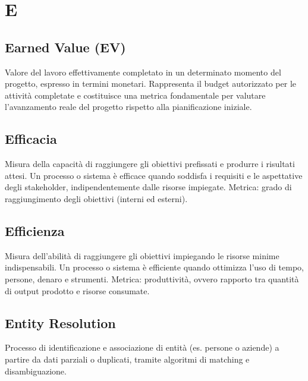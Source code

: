 \documentclass[a4paper,11pt]{article}
\begin{document}
\newpage





\section{E}

\subsection{Earned Value (EV)}
Valore del lavoro effettivamente completato in un determinato momento del progetto, espresso in termini monetari. Rappresenta il budget autorizzato per le attività completate e costituisce una metrica fondamentale per valutare l'avanzamento reale del progetto rispetto alla pianificazione iniziale.






\subsection{Efficacia}
Misura della capacità di raggiungere gli obiettivi prefissati e produrre i risultati attesi. Un processo o sistema è efficace quando soddisfa i requisiti e le aspettative degli stakeholder, indipendentemente dalle risorse impiegate. Metrica: grado di raggiungimento degli obiettivi (interni ed esterni).







\subsection{Efficienza}
Misura dell'abilità di raggiungere gli obiettivi impiegando le risorse minime indispensabili. Un processo o sistema è efficiente quando ottimizza l'uso di tempo, persone, denaro e strumenti. Metrica: produttività, ovvero rapporto tra quantità di output prodotto e risorse consumate.






\subsection{Entity Resolution}
Processo di identificazione e associazione di entità (es. persone o aziende) a partire da dati parziali o duplicati, tramite algoritmi di matching e disambiguazione.
\end{document}
